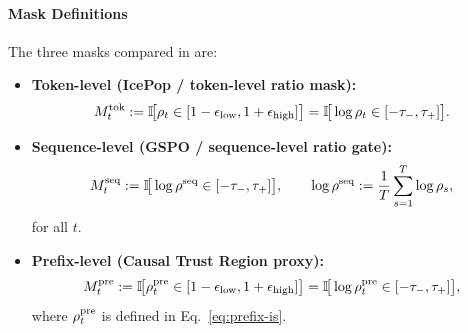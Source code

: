 \paragraph{Mask Definitions} The three masks compared in  are:
\begin{itemize}
    \item \textbf{Token-level (IcePop / token-level ratio mask):}
    \begin{equation*}
        M_t^{\mathrm{tok}}
        := \mathbb{I}\!\big[\rho_t \in [1-\epsilon_{\mathrm{low}},1+\epsilon_{\mathrm{high}}]\big]
        = \mathbb{I}\!\big[\log\rho_t \in [-\tau_-,\tau_+]\big].
    \end{equation*}
    \item \textbf{Sequence-level (GSPO / sequence-level ratio gate):}
    \begin{equation*}
        M_t^{\mathrm{seq}}
        := \mathbb{I}\!\big[\log\rho^{\mathrm{seq}} \in [-\tau_-,\tau_+]\big],
        \qquad
        \log\rho^{\mathrm{seq}} := \frac{1}{T}\sum_{s=1}^{T}\log\rho_s,
    \end{equation*}
    for all $t$.
    \item \textbf{Prefix-level (Causal Trust Region proxy):}
    \begin{equation*}
        M_t^{\mathrm{pre}}
        := \mathbb{I}\!\big[\rho_{t}^{\mathrm{pre}} \in [1-\epsilon_{\mathrm{low}},1+\epsilon_{\mathrm{high}}]\big]
        = \mathbb{I}\!\big[\log\rho_{t}^{\mathrm{pre}} \in [-\tau_-,\tau_+]\big],
    \end{equation*}
    where $\rho_{t}^{\mathrm{pre}}$ is defined in Eq.~\eqref{eq:prefix-is}.
\end{itemize}

